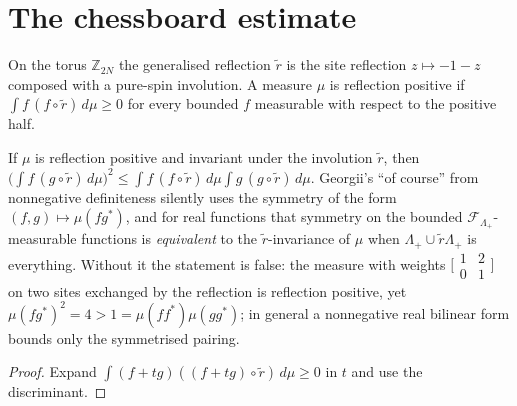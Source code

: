 \section{The chessboard estimate}

\begin{definition}
    \label{def:rp-17-7}
    \leanok

    On the torus $\mathbb Z_{2N}$ the generalised reflection $\tilde r$ is the site reflection
    $z \mapsto -1-z$ composed with a pure-spin involution. A measure $\mu$ is reflection positive
    if $\int f\,(f\circ\tilde r)\,d\mu \geq 0$ for every bounded $f$ measurable with respect to
    the positive half.
\end{definition}

\begin{lemma}[Georgii (17.8)]
    \label{lem:rp-17-8}
    \leanok

    If $\mu$ is reflection positive and invariant under the involution $\tilde r$, then
    $\bigl(\int f\,(g\circ\tilde r)\,d\mu\bigr)^2 \leq \int f\,(f\circ\tilde r)\,d\mu
    \int g\,(g\circ\tilde r)\,d\mu$. Georgii's ``of course'' from nonnegative definiteness
    silently uses the symmetry of the form $(f,g) \mapsto \mu(fg^*)$, and for real functions
    that symmetry on the bounded $\mathcal F_{\Lambda_+}$-measurable functions is
    \emph{equivalent} to the $\tilde r$-invariance of $\mu$ when $\Lambda_+ \cup \tilde r\Lambda_+$
    is everything. Without it the statement is false: the measure with weights
    $\bigl[\begin{smallmatrix}1&2\\0&1\end{smallmatrix}\bigr]$ on two sites exchanged by the
    reflection is reflection positive, yet $\mu(fg^*)^2 = 4 > 1 = \mu(ff^*)\mu(gg^*)$; in
    general a nonnegative real bilinear form bounds only the symmetrised pairing.
\end{lemma}
\begin{proof}
    \leanok
    Expand $\int (f+tg)((f+tg)\circ\tilde r)\,d\mu \geq 0$ in $t$ and use the discriminant.
\end{proof}

